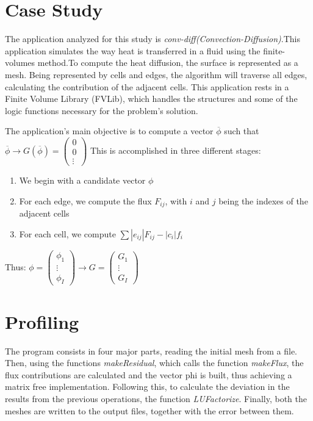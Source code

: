 \documentclass[a4paper,10pt,openright,openbib,twocolumn]{article}
\begin{document}
\section{Case Study}    %

The application analyzed for this study is \emph{conv-diff(Convection-Diffusion)}.This application simulates the way heat is transferred in a fluid using the finite-volumes method.To compute the heat diffusion, the surface is represented as a mesh. Being represented by cells and edges, the algorithm will traverse all edges, calculating the contribution of the adjacent cells. This application rests in a Finite Volume Library (FVLib), which handles the structures and some of the logic functions necessary for the problem's solution.

The application's main objective is to compute a vector $\overline{\phi}$ such that $\overline{\phi} \longrightarrow G(\overline{\phi}) = \left(\begin{array}{c}
0\\ 
0\\
\vdots\end{array}\right)$
This is accomplished in three different stages:
\begin{enumerate}
    \item {We begin with a candidate vector $\phi$} 
    \item {For each edge, we compute the flux $F_{ij}$, with $i$ and $j$ being the indexes of the adjacent cells}
    \item {For each cell, we compute $\sum |e_{ij}| F_{ij} - |c_i| f_i$}
\end{enumerate}
Thus: $\phi = \left(\begin{array}{c}
\phi_1\\
\vdots\\
\phi_I
\end{array}\right) \longrightarrow G = \left(\begin{array}{c}
G_1\\
\vdots\\
G_I
\end{array}\right)$


\section{Profiling}    %

The program consists in four major parts, reading the initial mesh from a file. Then, using the functions \emph{makeResidual}, which calls the function \emph{makeFlux}, the flux contributions are calculated and the vector phi is built, thus achieving a matrix free implementation. Following this, to calculate the deviation in the results from the previous operations, the function \emph{LUFactorize}. Finally, both the meshes are written to the output files, together with the error between them.
 
\end{document}
